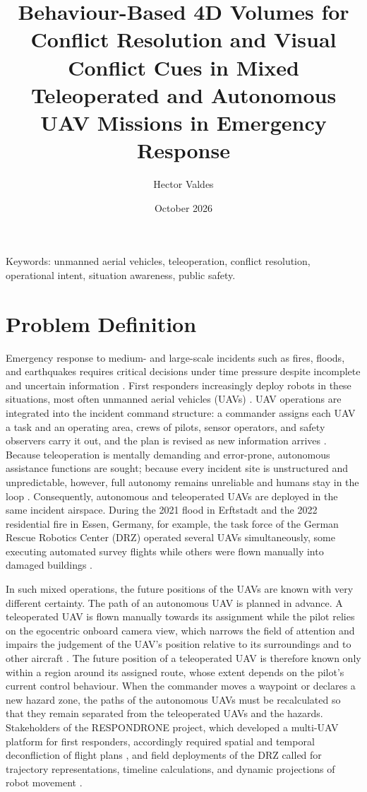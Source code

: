\documentclass{article}
\title{Behaviour-Based 4D Volumes for Conflict Resolution and Visual Conflict Cues in Mixed Teleoperated and Autonomous UAV Missions in Emergency Response}
\author{Hector Valdes}
\date{October 2026}
\begin{document}
\maketitle

Keywords:
unmanned aerial vehicles, teleoperation, conflict resolution, operational intent, situation awareness, public safety.

\section{Problem Definition}
Emergency response to medium- and large-scale incidents such as fires, floods, and earthquakes requires critical decisions under time pressure despite incomplete and uncertain information \cite{kruijff2021}.
First responders increasingly deploy robots in these situations, most often unmanned aerial vehicles (UAVs) \cite{kruijff2021, delmerico2019}.
UAV operations are integrated into the incident command structure: a commander assigns each UAV a task and an operating area, crews of pilots, sensor operators, and safety observers carry it out, and the plan is revised as new information arrives \cite{murphy2014disaster, kruijff2021}.
Because teleoperation is mentally demanding and error-prone, autonomous assistance functions are sought; because every incident site is unstructured and unpredictable, however, full autonomy remains unreliable and humans stay in the loop \cite{kruijff2021, surmann2024}.
Consequently, autonomous and teleoperated UAVs are deployed in the same incident airspace.
During the 2021 flood in Erftstadt and the 2022 residential fire in Essen, Germany, for example, the task force of the German Rescue Robotics Center (DRZ) operated several UAVs simultaneously, some executing automated survey flights while others were flown manually into damaged buildings \cite{surmann2024}.

In such mixed operations, the future positions of the UAVs are known with very different certainty.
The path of an autonomous UAV is planned in advance.
A teleoperated UAV is flown manually towards its assignment while the pilot relies on the egocentric onboard camera view, which narrows the field of attention and impairs the judgement of the UAV's position relative to its surroundings and to other aircraft \cite{thomas2001, hollands2011}.
The future position of a teleoperated UAV is therefore known only within a region around its assigned route, whose extent depends on the pilot's current control behaviour.
When the commander moves a waypoint or declares a new hazard zone, the paths of the autonomous UAVs must be recalculated so that they remain separated from the teleoperated UAVs and the hazards.
Stakeholders of the RESPONDRONE project, which developed a multi-UAV platform for first responders, accordingly required spatial and temporal deconfliction of flight plans \cite{friedrich2020respondrone}, and field deployments of the DRZ called for trajectory representations, timeline calculations, and dynamic projections of robot movement \cite{surmann2024}.
\end{document}
